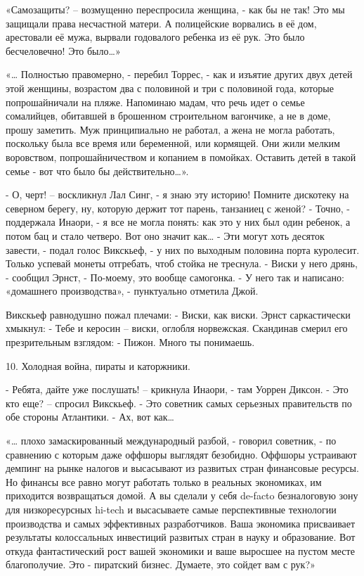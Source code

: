 \documentclass{book}
\begin{document}
«Самозащиты? -- возмущенно переспросила женщина, - как бы не так! Это мы защищали права несчастной матери. А полицейские ворвались в её дом, арестовали её мужа, вырвали годовалого ребенка из её рук. Это было бесчеловечно! Это было\ldots{}»

«\ldots{} Полностью правомерно, - перебил Торрес, - как и изъятие других двух детей этой женщины, возрастом два с половиной и три с половиной года, которые попрошайничали на пляже. Напоминаю мадам, что речь идет о семье сомалийцев, обитавшей в брошенном строительном вагончике, а не в доме, прошу заметить. Муж принципиально не работал, а жена не могла работать, поскольку была все время или беременной, или кормящей. Они жили мелким воровством, попрошайничеством и копанием в помойках. Оставить детей в такой семье - вот что было бы действительно\ldots{}».

- О, черт! -- воскликнул Лал Синг, - я знаю эту историю! Помните дискотеку на северном берегу, ну, которую держит тот парень, танзаниец с женой?
- Точно, - поддержала Инаори, - я все не могла понять: как это у них был один ребенок, а потом бац и стало четверо. Вот оно значит как\ldots{}
- Эти могут хоть десяток завести, - подал голос Викскьеф, - у них по выходным половина порта куролесит. Только успевай монеты отгребать, чтоб стойка не треснула.
- Виски у него дрянь, - сообщил Эрнст, - По-моему, это вообще самогонка.
- У него так и написано: «домашнего производства», - пунктуально отметила Джой.

Викскьеф равнодушно пожал плечами:
- Виски, как виски.
Эрнст саркастически хмыкнул:
- Тебе и керосин -- виски, оглобля норвежская.
Скандинав смерил его презрительным взглядом:
- Пижон. Много ты понимаешь.



10. Холодная война, пираты и каторжники.


- Ребята, дайте уже послушать! -- крикнула Инаори, - там Уоррен Диксон.
- Это кто еще? -- спросил Викскьеф.
- Это советник самых серьезных правительств по обе стороны Атлантики.
- Ах, вот как\ldots{}

«\ldots{} плохо замаскированный международный разбой, - говорил советник, - по сравнению с которым даже оффшоры выглядят безобидно. Оффшоры устраивают демпинг на рынке налогов и высасывают из развитых стран финансовые ресурсы. Но финансы все равно могут работать только в реальных экономиках, им приходится возвращаться домой. А вы сделали у себя de-facto безналоговую зону для низкоресурсных hi-tech и высасываете самые перспективные технологии производства и самых эффективных разработчиков. Ваша экономика присваивает результаты колоссальных инвестиций развитых стран в науку и образование. Вот откуда фантастический рост вашей экономики и ваше выросшее на пустом месте благополучие. Это - пиратский бизнес. Думаете, это сойдет вам с рук?»
\end{document}
